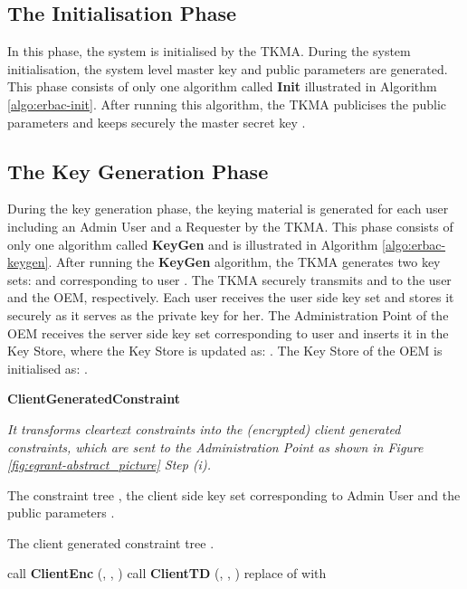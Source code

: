 \documentclass[epsfig,a4paper,11pt,titlepage]{book}
\numberwithin{algorithm}{chapter}
\newcommand{\algofontsize}{\fontsize{11}{12}\selectfont}
\begin{document}
\subsection{The Initialisation Phase}
In this phase, the system is initialised by the \gls{TKMA}. During the system initialisation, the system level master key and public parameters are generated. This phase consists of only one algorithm called \textbf{Init} illustrated in Algorithm \ref{algo:erbac-init}. After running this algorithm, the \gls{TKMA} publicises the public parameters   and keeps securely the master secret key .

\subsection{The Key Generation Phase}
During the key generation phase, the keying material is generated for each user including an Admin User and a Requester by the \gls{TKMA}. This phase consists of only one algorithm called \textbf{KeyGen} and is illustrated in Algorithm \ref{algo:erbac-keygen}. After running the \textbf{KeyGen} algorithm, the \gls{TKMA} generates two key sets:  and  corresponding to user . The \gls{TKMA} securely transmits  and  to the user  and the \gls{OEM}, respectively. Each user  receives the user side key set  and stores it securely as it serves as the private key for her. The Administration Point of the \gls{OEM} receives the server side key set  corresponding to user  and inserts it in the Key Store, where the Key Store is updated as: . The Key Store of the \gls{OEM} is initialised as: .



\begin{algorithm} [htp]
{\algofontsize
\caption{\textbf{ClientGeneratedConstraint}}

\label{algo:egrant-client-generated-constraint}

\begin{algorithmic}[1]

\INPUT \emph{It transforms cleartext constraints into the (encrypted) client generated constraints, which are sent to the Administration Point as shown in Figure \ref{fig:egrant-abstract_picture} Step (i).}

\Require The constraint tree , the client side key set  corresponding to Admin User  and the public parameters .

\Ensure The client generated constraint tree .

\medskip

\State 


	\State  call \textbf{ClientEnc} (, , )
	\State  call \textbf{ClientTD} (, , )
	\State 
	\State replace  of  with 

\EndFor

\Return 

\end{algorithmic}
}
\end{algorithm}
\end{document}

